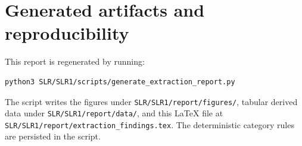 \documentclass[11pt]{article}
\begin{document}
\section{Generated artifacts and reproducibility}
This report is regenerated by running:
\begin{verbatim}
python3 SLR/SLR1/scripts/generate_extraction_report.py
\end{verbatim}
The script writes the figures under \texttt{SLR/SLR1/report/figures/}, tabular derived data under \texttt{SLR/SLR1/report/data/}, and this LaTeX file at \texttt{SLR/SLR1/report/extraction\_findings.tex}.  The deterministic category rules are persisted in the script.
\end{document}
